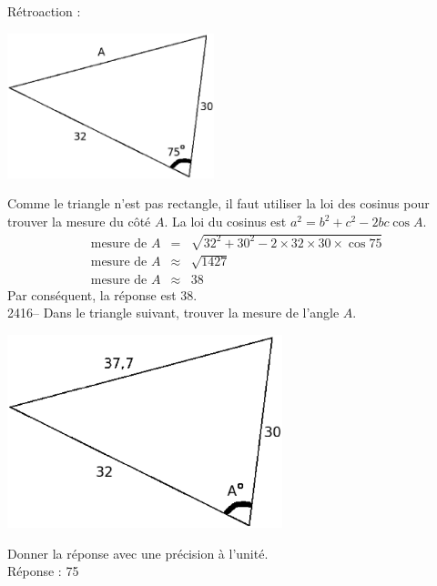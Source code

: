 \documentclass[letterpaper, 12pt]{article}
\begin{document}
R\'etroaction :\\
\begin{center}
 \includegraphics[width=6cm,bb=0 491 494 842]{Q2415.eps}
\end{center}
Comme le triangle n'est pas rectangle, il faut utiliser la loi des cosinus pour trouver la mesure du c\^ot\'e $A$. La loi du cosinus est $a^{2}=b^{2}+c^{2}-2bc\cos{A}$.
\begin{eqnarray*}
 \textrm{mesure de }A &=& \sqrt{32^{2} + 30^{2} - 2 \times 32 \times 30 \times \cos{75}}\\
 \textrm{mesure de }A &\approx& \sqrt{1427}\\
 \textrm{mesure de }A &\approx& 38
\end{eqnarray*}
Par cons\'equent, la r\'eponse est 38.\\

2416-- Dans le triangle suivant, trouver la mesure de l'angle $A$.\\
\begin{center}
 \includegraphics[width=8cm,bb=0 491 494 842]{Q2416.eps}
\end{center}
Donner la r\'eponse avec une pr\'ecision \`a l'unit\'e.\\

R\'eponse : 75\\
\end{document}
